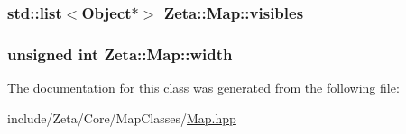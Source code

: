 \hypertarget{classZeta_1_1Map_a3b792a8851f4e9805ed5cc3afaec5399}{
\subsubsection[{visibles}]{\setlength{\rightskip}{0pt plus 5cm}std\+::list$<${\bf Object}$\ast$$>$ Zeta\+::\+Map\+::visibles\hspace{0.3cm}{\ttfamily [protected]}}}\label{classZeta_1_1Map_a3b792a8851f4e9805ed5cc3afaec5399}
\hypertarget{classZeta_1_1Map_abcd90abc2faf333eeedd81aa4c45853b}{
\subsubsection[{width}]{\setlength{\rightskip}{0pt plus 5cm}unsigned int Zeta\+::\+Map\+::width\hspace{0.3cm}{\ttfamily [protected]}}}\label{classZeta_1_1Map_abcd90abc2faf333eeedd81aa4c45853b}


The documentation for this class was generated from the following file\+:\begin{DoxyCompactItemize}
\item 
include/\+Zeta/\+Core/\+Map\+Classes/\hyperlink{Map_8hpp}{Map.\+hpp}\end{DoxyCompactItemize}

